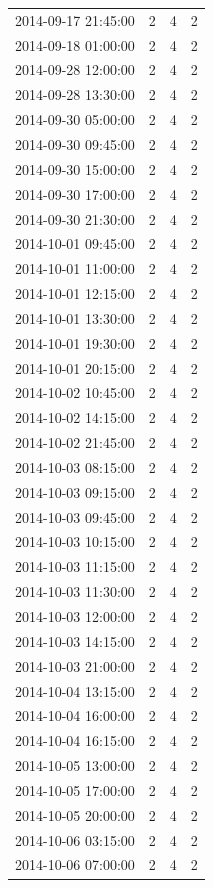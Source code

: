 \begin{tabular}{lrrr}
2014-09-17 21:45:00 & 2 & 4 & 2 \\
2014-09-18 01:00:00 & 2 & 4 & 2 \\
2014-09-28 12:00:00 & 2 & 4 & 2 \\
2014-09-28 13:30:00 & 2 & 4 & 2 \\
2014-09-30 05:00:00 & 2 & 4 & 2 \\
2014-09-30 09:45:00 & 2 & 4 & 2 \\
2014-09-30 15:00:00 & 2 & 4 & 2 \\
2014-09-30 17:00:00 & 2 & 4 & 2 \\
2014-09-30 21:30:00 & 2 & 4 & 2 \\
2014-10-01 09:45:00 & 2 & 4 & 2 \\
2014-10-01 11:00:00 & 2 & 4 & 2 \\
2014-10-01 12:15:00 & 2 & 4 & 2 \\
2014-10-01 13:30:00 & 2 & 4 & 2 \\
2014-10-01 19:30:00 & 2 & 4 & 2 \\
2014-10-01 20:15:00 & 2 & 4 & 2 \\
2014-10-02 10:45:00 & 2 & 4 & 2 \\
2014-10-02 14:15:00 & 2 & 4 & 2 \\
2014-10-02 21:45:00 & 2 & 4 & 2 \\
2014-10-03 08:15:00 & 2 & 4 & 2 \\
2014-10-03 09:15:00 & 2 & 4 & 2 \\
2014-10-03 09:45:00 & 2 & 4 & 2 \\
2014-10-03 10:15:00 & 2 & 4 & 2 \\
2014-10-03 11:15:00 & 2 & 4 & 2 \\
2014-10-03 11:30:00 & 2 & 4 & 2 \\
2014-10-03 12:00:00 & 2 & 4 & 2 \\
2014-10-03 14:15:00 & 2 & 4 & 2 \\
2014-10-03 21:00:00 & 2 & 4 & 2 \\
2014-10-04 13:15:00 & 2 & 4 & 2 \\
2014-10-04 16:00:00 & 2 & 4 & 2 \\
2014-10-04 16:15:00 & 2 & 4 & 2 \\
2014-10-05 13:00:00 & 2 & 4 & 2 \\
2014-10-05 17:00:00 & 2 & 4 & 2 \\
2014-10-05 20:00:00 & 2 & 4 & 2 \\
2014-10-06 03:15:00 & 2 & 4 & 2 \\
2014-10-06 07:00:00 & 2 & 4 & 2 \\

\end{tabular}
